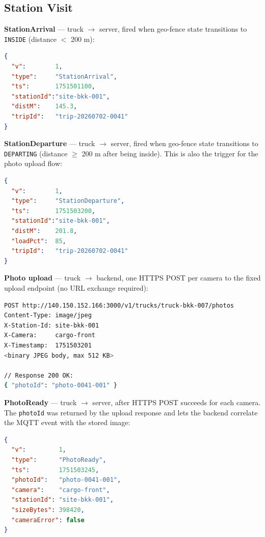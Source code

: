 \documentclass{article}
\begin{document}
\subsection{Station Visit}

\textbf{StationArrival} --- truck $\to$ server, fired when geo-fence state
transitions to \texttt{INSIDE} (distance $<$ 200 m):

\begin{lstlisting}[language=json, caption=Topic: trucks/truck-bkk-007/event | QoS 1]
{
  "v":        1,
  "type":     "StationArrival",
  "ts":       1751501100,
  "stationId":"site-bkk-001",
  "distM":    145.3,
  "tripId":   "trip-20260702-0041"
}
\end{lstlisting}

\textbf{StationDeparture} --- truck $\to$ server, fired when geo-fence state
transitions to \texttt{DEPARTING} (distance $\geq$ 200 m after being inside).
This is also the trigger for the photo upload flow:

\begin{lstlisting}[language=json, caption=Topic: trucks/truck-bkk-007/event | QoS 1]
{
  "v":        1,
  "type":     "StationDeparture",
  "ts":       1751503200,
  "stationId":"site-bkk-001",
  "distM":    201.8,
  "loadPct":  85,
  "tripId":   "trip-20260702-0041"
}
\end{lstlisting}

\textbf{Photo upload} --- truck $\to$ backend, one HTTPS POST per camera
to the fixed upload endpoint (no URL exchange required):

\begin{lstlisting}[language=bash, caption=HTTPS POST photo upload (repeated for cargo-rear)]
POST http://140.150.152.166:3000/v1/trucks/truck-bkk-007/photos
Content-Type: image/jpeg
X-Station-Id: site-bkk-001
X-Camera:     cargo-front
X-Timestamp:  1751503201
<binary JPEG body, max 512 KB>

// Response 200 OK:
{ "photoId": "photo-0041-001" }
\end{lstlisting}

\textbf{PhotoReady} --- truck $\to$ server, after HTTPS POST succeeds for each
camera. The \texttt{photoId} was returned by the upload response and lets
the backend correlate the MQTT event with the stored image:

\begin{lstlisting}[language=json, caption=Topic: trucks/truck-bkk-007/photo/ready | QoS 1]
{
  "v":         1,
  "type":      "PhotoReady",
  "ts":        1751503245,
  "photoId":   "photo-0041-001",
  "camera":    "cargo-front",
  "stationId": "site-bkk-001",
  "sizeBytes": 398420,
  "cameraError": false
}
\end{lstlisting}
\end{document}
